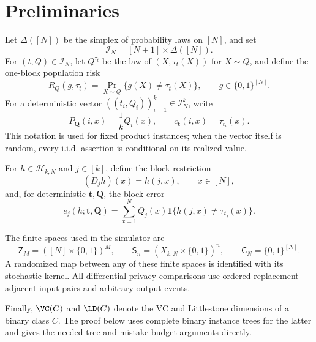 \section{Preliminaries}\label{sec:preliminaries}

Let $\Delta([N])$ be the simplex of probability laws on $[N]$, and set
\[
\mathcal I_N=[N+1]\times\Delta([N]).
\]
For $(t,Q)\in\mathcal I_N$, let $Q^{\tau_t}$ be the law of
$(X,\tau_t(X))$ for $X\sim Q$, and define the one-block population risk
\[
R_Q(g,\tau_t)=\Pr_{X\sim Q}\{g(X)\ne\tau_t(X)\},
\qquad g\in\{0,1\}^{[N]}.
\]
For a deterministic vector
$((t_i,Q_i))_{i=1}^k\in\mathcal I_N^k$, write
\[
P_{\boldsymbol Q}(i,x)=\frac1kQ_i(x),
\qquad
c_{\boldsymbol t}(i,x)=\tau_{t_i}(x).
\]
This notation is used for fixed product instances; when the vector itself is
random, every i.i.d. assertion is conditional on its realized value.

For $h\in\mathcal H_{k,N}$ and $j\in[k]$, define the block restriction
\[
(D_jh)(x)=h(j,x),\qquad x\in[N],
\]
and, for deterministic $\boldsymbol t,\boldsymbol Q$, the block error
\[
e_j(h;\boldsymbol t,\boldsymbol Q)
=\sum_{x=1}^NQ_j(x)\mathbf 1\{h(j,x)\ne\tau_{t_j}(x)\}.
\]

The finite spaces used in the simulator are
\[
\mathsf Z_M=([N]\times\{0,1\})^M,
\qquad
\mathsf S_n=(X_{k,N}\times\{0,1\})^n,
\qquad
\mathsf G_N=\{0,1\}^{[N]}.
\]
A randomized map between any of these finite spaces is identified with its
stochastic kernel.  All differential-privacy comparisons use ordered
replacement-adjacent input pairs and arbitrary output events.

Finally, $\VC(C)$ and $\LD(C)$ denote the VC and Littlestone dimensions of a
binary class $C$.  The proof below uses complete binary instance trees for
the latter and gives the needed tree and mistake-budget arguments directly.
